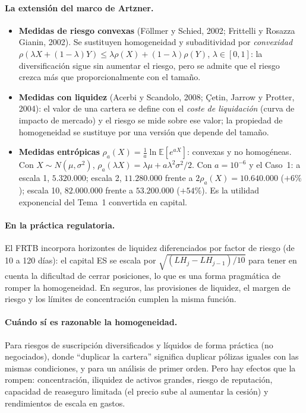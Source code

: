 \documentclass[a4paper,12pt]{article}
\newcommand{\E}{\mathbb{E}}
\begin{document}
\paragraph{La extensi\'on del marco de Artzner.}
\begin{itemize}[leftmargin=*,itemsep=2pt]
\item \textbf{Medidas de riesgo convexas} (F\"ollmer y Schied, 2002; Frittelli y Rosazza Gianin, 2002). Se sustituyen homogeneidad y subaditividad por \emph{convexidad} $\rho(\lambda X+(1-\lambda)Y)\le\lambda\rho(X)+(1-\lambda)\rho(Y)$, $\lambda\in[0,1]$: la diversificaci\'on sigue sin aumentar el riesgo, pero se admite que el riesgo crezca m\'as que proporcionalmente con el tama\~no.
\item \textbf{Medidas con liquidez} (Acerbi y Scandolo, 2008; Çetin, Jarrow y Protter, 2004): el valor de una cartera se define con el \emph{coste de liquidaci\'on} (curva de impacto de mercado) y el riesgo se mide sobre ese valor; la propiedad de homogeneidad se sustituye por una versi\'on que depende del tama\~no.
\item \textbf{Medidas entr\'opicas} $\rho_a(X)=\frac1a\ln\E[e^{aX}]$: convexas y no homog\'eneas. Con $X\sim N(\mu,\sigma^2)$, $\rho_a(\lambda X)=\lambda\mu+a\lambda^2\sigma^2/2$. Con $a=10^{-6}$ y el Caso~1: a escala 1, $5.320.000$; escala 2, $11.280.000$ frente a $2\rho_a(X)=10.640.000$ ($+6\%$); escala 10, $82.000.000$ frente a $53.200.000$ ($+54\%$). Es la utilidad exponencial del Tema~1 convertida en capital.
\end{itemize}

\paragraph{En la pr\'actica regulatoria.} El FRTB incorpora horizontes de liquidez diferenciados por factor de riesgo (de 10 a 120 d\'ias): el capital ES se escala por $\sqrt{(LH_j-LH_{j-1})/10}$ para tener en cuenta la dificultad de cerrar posiciones, lo que es una forma pragm\'atica de romper la homogeneidad. En seguros, las provisiones de liquidez, el margen de riesgo y los l\'imites de concentraci\'on cumplen la misma funci\'on.

\paragraph{Cu\'ando s\'i es razonable la homogeneidad.} Para riesgos de suscripci\'on diversificados y l\'iquidos de forma pr\'actica (no negociados), donde ``duplicar la cartera'' significa duplicar p\'olizas iguales con las mismas condiciones, y para un an\'alisis de primer orden. Pero hay efectos que la rompen: concentraci\'on, iliquidez de activos grandes, riesgo de reputaci\'on, capacidad de reaseguro limitada (el precio sube al aumentar la cesi\'on) y rendimientos de escala en gastos.
\end{document}
